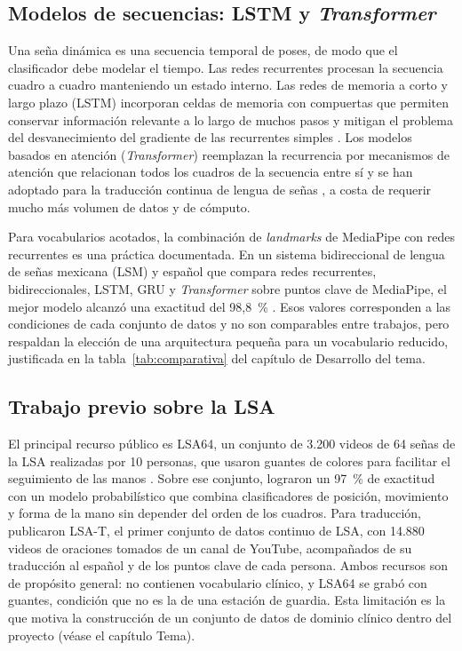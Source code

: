 \subsection{Modelos de secuencias: LSTM y \emph{Transformer}}

Una seña dinámica es una secuencia temporal de poses, de modo que el clasificador debe modelar el tiempo. Las redes recurrentes procesan la secuencia cuadro a cuadro manteniendo un estado interno. Las redes de memoria a corto y largo plazo (LSTM) incorporan celdas de memoria con compuertas que permiten conservar información relevante a lo largo de muchos pasos y mitigan el problema del desvanecimiento del gradiente de las recurrentes simples \parencite{hochreiter1997lstm}. Los modelos basados en atención (\emph{Transformer}) reemplazan la recurrencia por mecanismos de atención que relacionan todos los cuadros de la secuencia entre sí \parencite{vaswani2017attention} y se han adoptado para la traducción continua de lengua de señas \parencite{camgoz2020transformers}, a costa de requerir mucho más volumen de datos y de cómputo.

Para vocabularios acotados, la combinación de \emph{landmarks} de MediaPipe con redes recurrentes es una práctica documentada. En un sistema bidireccional de lengua de señas mexicana (LSM) y español que compara redes recurrentes, bidireccionales, LSTM, GRU y \emph{Transformer} sobre puntos clave de MediaPipe, el mejor modelo alcanzó una exactitud del 98,8~\% \parencite{gonzalez2024msl}. Esos valores corresponden a las condiciones de cada conjunto de datos y no son comparables entre trabajos, pero respaldan la elección de una arquitectura pequeña para un vocabulario reducido, justificada en la tabla~\ref{tab:comparativa} del capítulo de Desarrollo del tema.

\subsection{Trabajo previo sobre la LSA}

El principal recurso público es LSA64, un conjunto de 3.200 videos de 64 señas de la LSA realizadas por 10 personas, que usaron guantes de colores para facilitar el seguimiento de las manos \parencite{ronchetti2016lsa64}. Sobre ese conjunto, \textcite{ronchetti2016bow} lograron un 97~\% de exactitud con un modelo probabilístico que combina clasificadores de posición, movimiento y forma de la mano sin depender del orden de los cuadros. Para traducción, \textcite{dalbianco2022lsat} publicaron LSA-T, el primer conjunto de datos continuo de LSA, con 14.880 videos de oraciones tomados de un canal de YouTube, acompañados de su traducción al español y de los puntos clave de cada persona. Ambos recursos son de propósito general: no contienen vocabulario clínico, y LSA64 se grabó con guantes, condición que no es la de una estación de guardia. Esta limitación es la que motiva la construcción de un conjunto de datos de dominio clínico dentro del proyecto (véase el capítulo Tema).

